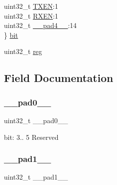 \begin{DoxyCompactItemize}
\begin{tabbing}
\>uint32\_t \mbox{\hyperlink{union_s_e_r_c_o_m___u_s_a_r_t___c_t_r_l_b___type_a990ff45da525fb99fc34219edef36ed7}{TXEN}}:1\\
\>uint32\_t \mbox{\hyperlink{union_s_e_r_c_o_m___u_s_a_r_t___c_t_r_l_b___type_a9251068a37a3410c80d0ff33e3767c03}{RXEN}}:1\\
\>uint32\_t \mbox{\hyperlink{union_s_e_r_c_o_m___u_s_a_r_t___c_t_r_l_b___type_a7b2edc85d90e34c4435951e1e5c59517}{\_\_pad4\_\_}}:14\\
\} \mbox{\hyperlink{union_s_e_r_c_o_m___u_s_a_r_t___c_t_r_l_b___type_a96ff589355bf506b4b461d79e9ce71e7}{bit}}\\

\end{tabbing}\item 
uint32\+\_\+t \mbox{\hyperlink{union_s_e_r_c_o_m___u_s_a_r_t___c_t_r_l_b___type_a6b91636401516a477989a336376d7b40}{reg}}
\end{DoxyCompactItemize}


\subsection{Field Documentation}
\mbox{\label{union_s_e_r_c_o_m___u_s_a_r_t___c_t_r_l_b___type_a3e57c2ef1c3ffb36722f000cc1156824}} 
\subsubsection{\texorpdfstring{\_\_pad0\_\_}{\_\_pad0\_\_}}
{\footnotesize\ttfamily uint32\+\_\+t \+\_\+\+\_\+pad0\+\_\+\+\_\+}

bit\+: 3.. 5 Reserved \mbox{\label{union_s_e_r_c_o_m___u_s_a_r_t___c_t_r_l_b___type_a6712ba6dd1d5b43d2d56ff8ac4e275a7}} 
\subsubsection{\texorpdfstring{\_\_pad1\_\_}{\_\_pad1\_\_}}
{\footnotesize\ttfamily uint32\+\_\+t \+\_\+\+\_\+pad1\+\_\+\+\_\+}

